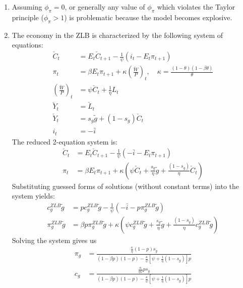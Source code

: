 \documentclass[11pt]{amsart}
\begin{document}
\begin{enumerate}[label = (\alph*)]
	\item Assuming $\phi_\pi = 0$, or generally any value of $\phi_\pi$ which violates the Taylor principle ($\phi_\pi >1$) is problematic because the model becomes explosive. 
	\item The economy in the ZLB is characterized by the following system of equations: 
	\begin{align*}
	\check { C } _ { t } &= E _ { t } \check { C } _ { t + 1} - \frac { 1} { \psi } \left( i_t - E _ { t } \pi _ { t + 1} \right)  \\ 
	\pi _ { t } &= \beta E _ { t } \pi _ { t + 1} + \kappa \left( \frac { \check {W} } { P } \right)_t ,\quad \kappa = \frac { ( 1- \theta ) ( 1- \beta \theta ) } { \theta }  \\
	\left( \frac { \check{ W } } { P } \right) _ { t } &= \psi \check { C } _ { t } + \frac { 1} { \eta } L _ { t } \\
	\check { Y } _ { t } &= \check { L } _ { t } \\
	\check{ Y }_t &= s_g \tilde{g} + (1-s_g) \check{ C }_t \\
	i_t &= -\bar{i}
	\end{align*}
	The reduced 2-equation system is: 
	\begin{align*}
	\check { C } _ { t } &= E _ { t } \check { C } _ { t + 1} - \frac { 1} { \psi } \left( -\bar{i} - E _ { t } \pi _ { t + 1} \right) \\
	\pi_t &= \beta E_t \pi_{t+1} + \kappa \left( \psi \check{ C }_t + \frac{s_g}{\eta} \tilde{g} + \frac{(1-s_g)}{\eta} \check{ C }_t \right)
	\end{align*}
	Substituting guessed forms of solutions (without constant terms) into the system yields: 
	\begin{align*}
	c_g^{ZLB}\tilde{g} &= p c_g^{ZLB} \tilde{g} - \frac { 1} { \psi } \left( -\bar{i} - p \pi_g^{ZLB} \tilde{g} \right) \\
	\pi_g^{ZLB} \tilde{g} &= \beta p \pi_g^{ZLB} \tilde{g} + \kappa \left( \psi c_g^{ZLB} \tilde{g} + \frac{s_g}{\eta} \tilde{g} + \frac{(1-s_g)}{\eta} c_g^{ZLB}\tilde{g} \right)
	\end{align*}
	Solving the system gives us 
	\begin{align*}
	\pi _ { g } &= \frac { \frac { \kappa } { \eta } ( 1- p ) s _ { g } } { ( 1- \beta p ) ( 1- p ) - \frac { \kappa } { \psi } \left[ \psi + \frac { 1} { \eta } \left( 1- s _ { g } \right) \right] p } \\
	c _ { g } &= \frac { \frac { \kappa } { \eta \psi } p s _ { g } } { ( 1- \beta p ) ( 1- p ) - \frac { \kappa } { \psi } \left[ \psi + \frac { 1} { \eta } \left( 1- s _ { g } \right) \right] p }

\end{align*}
\end{enumerate}
\end{document}
